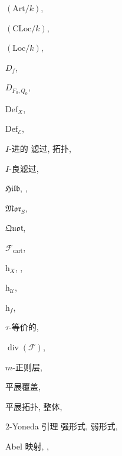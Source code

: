 \begin{theindex}
{}
\begingroup
\small
\def\sF{\mathcal F}\def\sL{\mathcal L}
\def\sQ{\mathcal Q}\def\sE{\mathcal E}

\item $(\mathrm{Art}/k)$, 
\item $(\mathrm{CLoc}/k)$, 
\item $(\mathrm{Loc}/k)$, 
\item $D_f$, 
\item $D_{F_0,Q_0}$, 
\item $\mathrm{Def}_X$, 
\item $\mathrm{Def}_{\sE}$, 
\item $I$-进的
\subitem 滤过, 
\subitem 拓扑, 
\item $I$-良滤过, 
\item $\mathfrak{Hilb}$, , 
\item $\mathfrak{Mor}_S$, 
\item $\mathfrak{Quot}$, 
\item $\sF_{\mathrm{cart}}$, 
\item $\mathrm h_X$, , 
\item $\mathrm h_{\mathcal U}$, 
\item $\mathrm h_f$, 
\item $\tau$-等价的, 
\item $\operatorname{div}(\sF)$, 
\item $m$-正则层, 
\item 平展覆盖, 
\item 平展拓扑, 
\subitem 整体, 
\item $2$-Yoneda 引理
\subitem 强形式, 
\subitem 弱形式, 
\indexspace
\item Abel 映射, , 

\end{theindex}
